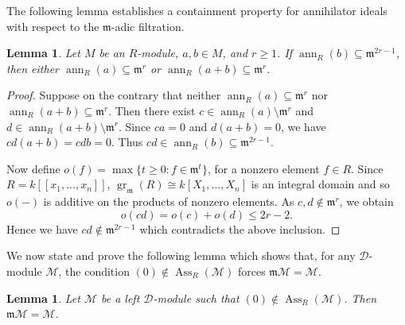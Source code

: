 \documentclass[11pt]{amsart}
\newtheorem{lemma}[theorem]{Lemma}
\theoremstyle{definition}
\newcommand{\m}{\mathfrak m}
\newcommand{\D}{\mathcal D}
\newcommand{\M}{\mathcal M}
\DeclareMathOperator{\ann}{ann}
\DeclareMathOperator{\Ass}{Ass}
\begin{document}
The following lemma establishes a containment property for annihilator ideals with respect to the $\mathfrak m$-adic filtration.
\begin{lemma}\label{l2}
Let $M$ be an $R$-module, $a,b\in M$, and $r\ge1$. If
$\ann_R(b)\subseteq\m^{2r-1}$, then either $ \ann_R(a)\subseteq\m^r$ or $ \ann_R(a+b)\subseteq\m^r.$
\end{lemma}


\begin{proof}
Suppose on the contrary that neither $ \ann_R(a)\subseteq\m^r$ nor $ \ann_R(a+b)\subseteq\m^r.$ Then there exist $c\in\ann_R(a)\setminus\m^r$ and $d\in\ann_R(a+b)\setminus\m^r$. Since $ca=0$ and $d(a+b)=0$, we have $cd(a+b)=cdb=0$. Thus $cd\in\ann_R(b)\subseteq\m^{2r-1}$.


Now define $o(f)=\max\{t\geq0:f\in\m^t\}$, for a nonzero element $f\in R$. Since $R=k[[x_1,...,x_n]]$, $\operatorname{gr}_{\m}(R)\cong k[X_1,\ldots,X_n]$ is an integral domain and so $o(-)$ is additive on the products of nonzero elements. As $c,d\notin\m^r$, we obtain
\[
o(cd)
=o(c)+o(d)
\leq 2r-2.
\]
Hence we have  $cd\notin\m^{2r-1}$ which contradicts the above inclusion.
\end{proof}
We now state and prove the following lemma which shows that, for any $\D$-module $\M$, the condition $(0)\notin\Ass_R(\M)$ forces $\m \M=\M$.

\begin{lemma}\label{l3}
Let $\M$ be a left $\D$-module such that $(0)\notin\Ass_R(\M)$. Then $\m\M=\M$.
\end{lemma}
\end{document}
